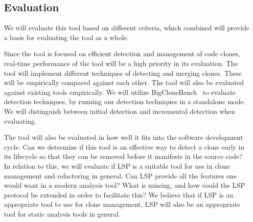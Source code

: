 \subsection{Evaluation}

We will evaluate this tool based on different criteria, which combined will provide a
basis for evaluating the tool as a whole.

Since the tool is focused on efficient detection and management of code clones, real-time
performance of the tool will be a high priority in its evaluation. The tool will implement
different techniques of detecting and merging clones. These will be empirically compared
against each other. The tool will also be evaluated against existing tools empirically. We
will utilize BigCloneBench~\cite{BigCloneBench} to evaluate detection techniques, by
running our detection techniques in a standalone mode. We will distinguish between initial
detection and incremental detection when evaluating.

The tool will also be evaluated in how well it fits into the software development cycle.
Can we determine if this tool is an effective way to detect a clone early in its lifecycle
so that they can be removed before it manifests in the source code? In relation to this,
we will evaluate if LSP is a suitable tool for use in clone management and refactoring in
general. Can LSP provide all the features one would want in a modern analysis tool? What
is missing, and how could the LSP protocol be extended in order to facilitate this? We
believe that if LSP is an appropriate tool to use for clone management, LSP will also be
an appropriate tool for static analysis tools in general.
